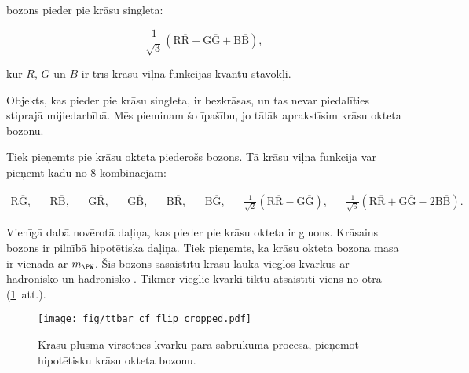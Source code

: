\PW bozons pieder pie krāsu singleta:

\begin{equation}
\frac{1}{\sqrt{3}}\left(\text{R}\overline{\text{R}}+\text{G}\overline{\text{G}}+\text{B}\overline{\text{B}}\right),
\end{equation}

kur $R$, $G$ un $B$ ir trīs krāsu viļna funkcijas kvantu stāvokļi.

Objekts, kas pieder pie krāsu singleta, ir bezkrāsas, un tas nevar piedalīties stiprajā mijiedarbībā. Mēs pieminam šo īpašību, jo tālāk aprakstīsim krāsu okteta \PW bozonu.

Tiek pieņemts pie krāsu okteta piederošs \PW bozons. Tā krāsu viļna funkcija var pieņemt kādu no 8 kombinācjām:

\begin{align}
\text{R}\overline{\text{G}}, &&
\text{R}\overline{\text{B}}, &&
\text{G}\overline{\text{R}}, &&
\text{G}\overline{\text{B}}, &&
\text{B}\overline{\text{R}}, &&
\text{B}\overline{\text{G}}, &&
\frac{1}{\sqrt{2}}\left(\text{R}\overline{\text{R}}-\text{G}\overline{\text{G}}\right), &&
\frac{1}{\sqrt{6}}\left(\text{R}\overline{\text{R}}+\text{G}\overline{\text{G}}-2\text{B}\overline{\text{B}}\right).
\end{align}

Vienīgā dabā novērotā daļiņa, kas pieder pie krāsu okteta ir gluons. Krāsains \PW bozons ir pilnībā hipotētiska daļiņa. Tiek pieņemts, ka krāsu okteta \PW bozona masa ir vienāda ar $m_{\PW}$. Šis bozons sasaistītu krāsu laukā vieglos kvarkus ar hadronisko \cPqb un hadronisko \cPqt. Tikmēr vieglie kvarki tiktu atsaistīti viens no otra (\ref{fig:ttbar_cf_octet}~att.).
  
  \begin{figure}[h!]
  \centering
  \texttt{[image: fig/ttbar\_cf\_flip\_cropped.pdf]}
  \caption{Krāsu plūsma virsotnes kvarku pāra sabrukuma procesā, pieņemot hipotētisku krāsu okteta \PW bozonu.}
  \label{fig:ttbar_cf_octet}
\end{figure}

